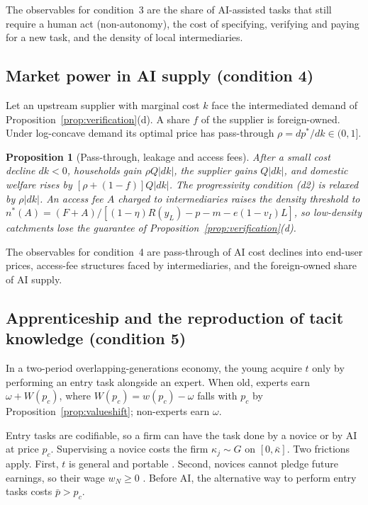 \documentclass[12pt]{article}
\newtheorem{proposition}{Proposition}
\theoremstyle{remark}
\begin{document}
The observables for condition~3 are the share of AI-assisted tasks that still require a human act (non-autonomy), the cost of specifying, verifying and paying for a new task, and the density of local intermediaries.

\subsection{Market power in AI supply (condition 4)}\label{sec:market}

Let an upstream supplier with marginal cost $k$ face the intermediated demand of Proposition~\ref{prop:verification}(d). A share $f$ of the supplier is foreign-owned. Under log-concave demand its optimal price has pass-through $\rho=dp^*/dk\in(0,1]$.

\begin{proposition}[Pass-through, leakage and access fees]\label{prop:market}
After a small cost decline $dk<0$, households gain $\rho Q|dk|$, the supplier gains $Q|dk|$, and domestic welfare rises by $[\rho+(1-f)]Q|dk|$. The progressivity condition (d2) is relaxed by $\rho|dk|$. An access fee $A$ charged to intermediaries raises the density threshold to $n^*(A)=(F+A)/[(1-\eta)R(y_L)-p-m-e(1-v_I)L]$, so low-density catchments lose the guarantee of Proposition~\ref{prop:verification}(d).
\end{proposition}

The observables for condition~4 are pass-through of AI cost declines into end-user prices, access-fee structures faced by intermediaries, and the foreign-owned share of AI supply.

\subsection{Apprenticeship and the reproduction of tacit knowledge (condition 5)}\label{sec:apprentice}

In a two-period overlapping-generations economy, the young acquire $t$ only by performing an entry task alongside an expert. When old, experts earn $\omega+W(p_c)$, where $W(p_c)=w(p_c)-\omega$ falls with $p_c$ by Proposition~\ref{prop:valueshift}; non-experts earn $\omega$.

Entry tasks are codifiable, so a firm can have the task done by a novice or by AI at price $p_c$. Supervising a novice costs the firm $\kappa_j\sim G$ on $[0,\bar\kappa]$. Two frictions apply. First, $t$ is general and portable \citep{becker1962investment}. Second, novices cannot pledge future earnings, so their wage $w_N\ge0$ \citep{ide2025automation}. Before AI, the alternative way to perform entry tasks costs $\bar p>p_c$.
\end{document}
